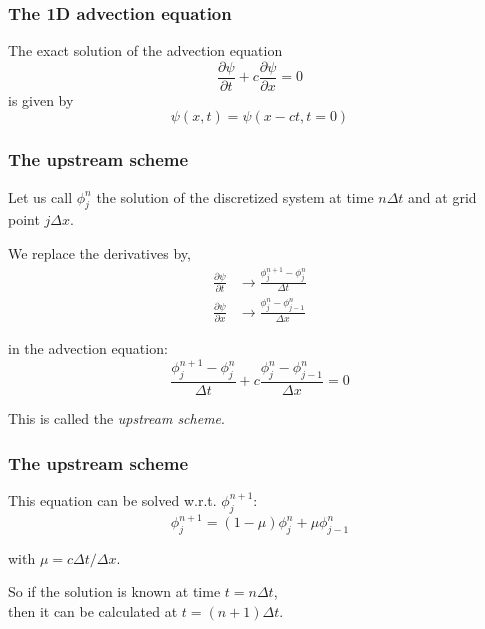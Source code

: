 \documentclass[aspectratio=43,9pt]{beamer}
\begin{document}
%
%
\begin{frame}
	\frametitle{The 1D advection equation}
	The exact solution of the advection equation\vspace*{2ex}
	\begin{equation*}
		\frac{\partial \psi}{\partial t}+c\frac{\partial\psi}{\partial x}=0
	\end{equation*}\vspace*{2ex}
	is given by\vspace*{2ex}
	\begin{equation*}
		\psi(x,t) = \psi(x-ct,t=0)
	\end{equation*}
\end{frame}
%
%
\begin{frame}
	\frametitle{The upstream scheme}
	Let us call $\phi_j^n$ the solution of the discretized system at time $n \Delta t$ and at grid point $j \Delta x$.\vspace*{2ex}
	\par
	We replace the derivatives by,\vspace*{2ex}
	\begin{align*}
		\frac{\partial \psi}{\partial t} &\rightarrow \frac{\phi_j^{n+1} - \phi_j^n}{\Delta t}\\
		\frac{\partial \psi}{\partial x} &\rightarrow  \frac{\phi_j^n - \phi_{j-1}^n}{\Delta x}
	\end{align*}\par\vspace*{2ex}
	in the advection equation:\vspace*{2ex}
	\begin{equation*}
		\frac{\phi_j^{n+1} - \phi_j^n}{\Delta t}
		+ c \frac{\phi_j^n - \phi_{j-1}^n}{\Delta x} = 0
	\end{equation*}\par\vspace*{2ex}
	This is called the \emph{upstream scheme}.
\end{frame}
%
%
\begin{frame}
	\frametitle{The upstream scheme}
	This equation can be solved w.r.t. $\phi_j^{n+1}$:\vspace*{2ex}
	\begin{equation*}
		\phi_j^{n+1} = (1-\mu) \phi_j^n + \mu \phi_{j-1}^n
	\end{equation*}\par\vspace*{2ex}
	with $\mu = c \Delta t / \Delta x$.
	\par\vspace*{2ex}
	So if the solution is known at time $t=n\Delta t$,\\ then it can be calculated at $t=(n+1)\Delta t$.
\end{frame}
\end{document}
